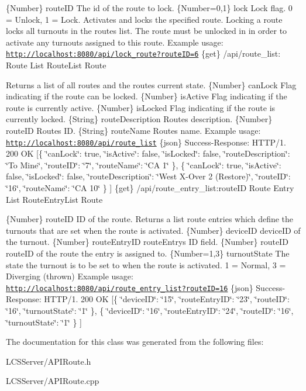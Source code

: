 \{Number\} route\+ID The id of the route to lock.  \{Number=0,1\} lock Lock flag. 0 = Unlock, 1 = Lock.  Activates and locks the specified route. Locking a route locks all turnouts in the route\textquotesingle{}s list. The route must be unlocked in in order to activate any turnouts assigned to this route.  Example usage\+: \href{http://localhost:8080/api/lock_route?routeID=6}{\tt http\+://localhost\+:8080/api/lock\+\_\+route?route\+I\+D=6}  \{get\} /api/route\+\_\+list\+: Route List  Route\+List  Route

Returns a list of all routes and the routes current state.  \{Number\} can\+Lock Flag indicating if the route can be locked.  \{Number\} is\+Active Flag indicating if the route is currently active.  \{Number\} is\+Locked Flag indicating if the route is currently locked.  \{String\} route\+Description Route\textquotesingle{}s description.  \{Number\} route\+ID Route\textquotesingle{}s ID.  \{String\} route\+Name Route\textquotesingle{}s name.  Example usage\+: \href{http://localhost:8080/api/route_list}{\tt http\+://localhost\+:8080/api/route\+\_\+list}  \{json\} Success-\/\+Response\+: H\+T\+T\+P/1. 200 OK \mbox{[}\{ \char`\"{}can\+Lock\char`\"{}\+: true, \char`\"{}is\+Active\char`\"{}\+: false, \char`\"{}is\+Locked\char`\"{}\+: false, \char`\"{}route\+Description\char`\"{}\+: \char`\"{}\+To Mine\char`\"{}, \char`\"{}route\+I\+D\char`\"{}\+: \char`\"{}7\char`\"{}, \char`\"{}route\+Name\char`\"{}\+: \char`\"{}\+C\+A 1\char`\"{} \}, \{ \char`\"{}can\+Lock\char`\"{}\+: true, \char`\"{}is\+Active\char`\"{}\+: false, \char`\"{}is\+Locked\char`\"{}\+: false, \char`\"{}route\+Description\char`\"{}\+: \char`\"{}\+West X-\/\+Over 2 (\+Restore)\char`\"{}, \char`\"{}route\+I\+D\char`\"{}\+: \char`\"{}16\char`\"{}, \char`\"{}route\+Name\char`\"{}\+: \char`\"{}\+C\+A 10\char`\"{} \} \mbox{]}  \{get\} /api/route\+\_\+entry\+\_\+list\+:route\+ID Route Entry List  Route\+Entry\+List  Route

\{Number\} route\+ID ID of the route.  Returns a list route entries which define the turnouts that are set when the route is activated.  \{Number\} device\+ID device\+ID of the turnout.  \{Number\} route\+Entry\+ID route\+Entry\textquotesingle{}s ID field.  \{Number\} route\+ID route\+ID of the route the entry is assigned to.  \{Number=1,3\} turnout\+State The state the turnout is to be set to when the route is activated. 1 = Normal, 3 = Diverging (thrown)  Example usage\+: \href{http://localhost:8080/api/route_entry_list?routeID=16}{\tt http\+://localhost\+:8080/api/route\+\_\+entry\+\_\+list?route\+I\+D=16}  \{json\} Success-\/\+Response\+: H\+T\+T\+P/1. 200 OK \mbox{[}\{ \char`\"{}device\+I\+D\char`\"{}\+: \char`\"{}15\char`\"{}, \char`\"{}route\+Entry\+I\+D\char`\"{}\+: \char`\"{}23\char`\"{}, \char`\"{}route\+I\+D\char`\"{}\+: \char`\"{}16\char`\"{}, \char`\"{}turnout\+State\char`\"{}\+: \char`\"{}1\char`\"{} \}, \{ \char`\"{}device\+I\+D\char`\"{}\+: \char`\"{}16\char`\"{}, \char`\"{}route\+Entry\+I\+D\char`\"{}\+: \char`\"{}24\char`\"{}, \char`\"{}route\+I\+D\char`\"{}\+: \char`\"{}16\char`\"{}, \char`\"{}turnout\+State\char`\"{}\+: \char`\"{}1\char`\"{} \} \mbox{]} 

The documentation for this class was generated from the following files\+:\begin{DoxyCompactItemize}
\item 
L\+C\+S\+Server/A\+P\+I\+Route.\+h\item 
L\+C\+S\+Server/A\+P\+I\+Route.\+cpp\end{DoxyCompactItemize}
